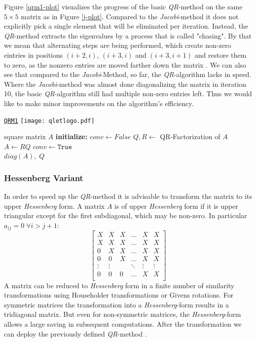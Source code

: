 \documentclass[12pt]{article}
\begin{document}
Figure \ref{qrm1-plot} visualizes the progress of the basic \textit{QR}-method on the same $5 \times 5$ matrix as in Figure \ref{j-plot}. Compared to the \textit{Jacobi}-method it does not explicitly pick a single element that will be eliminated per iteration. Instead, the \textit{QR}-method extracts the eigenvalues by a process that is called "chasing". By that we mean that alternating steps are being performed, which create non-zero eintries in positions $(i+2, i)$, $(i+3, i)$ and $(i+3, i+1)$ and restore them to zero, as the nonzero entries are moved farther down the matrix \citep[p. 130]{NLA}. We can also see that compared to the \textit{Jacobi}-Method, so far, the \textit{QR}-algorithm lacks in speed. Where the \textit{Jacobi}-method was almost done diagonalizing the matrix in iteration 10, the basic \textit{QR}-algorithm still had multiple non-zero entries left. Thus we would like to make minor improvements on the algorithm's efficiency.
\begin{algorithm}
\caption{\href {https://github.com/thsis/NIS18/blob/master/algorithms/eigen.py}{\texttt{QRM1}}  \protect\texttt{[image: qletlogo.pdf]}}
\label{qr1-meth}
  \begin{algorithmic}[1]
    \Require square matrix $A$
    \Statex \textbf{initialize: } $conv \gets False$
      \State $Q, R \gets$ QR-Factorization of $A$
      \State $A \gets RQ$
        \State $conv \gets \texttt{True}$
      \EndIf
    \EndWhile\\
    \Return $diag\left(A\right),\; Q$
  \end{algorithmic}
\end{algorithm}


\subsubsection{Hessenberg Variant}

In order to speed up the \textit{QR}-method it is advisable to transform the matrix to its upper \textit{Hessenberg} form. A matrix $A$ is of upper \textit{Hessenberg} form if it is upper triangular except for the first subdiagonal, which may be non-zero. In particular $a_{ij} = 0\; \forall i > j + 1$:
\small
$$
\begin{bmatrix}
X & X & X  & \dots &  X & X\\
X & X & X &  \dots &  X & X\\
0 & X & X &  \dots &  X & X\\
0 & 0 & X &  \dots &  X & X \\
\vdots &  \vdots & & \ddots  & \vdots  & \vdots\\
0 & 0 & 0 &  \dots &  X & X \\
\end{bmatrix}$$
\normalsize
A matrix can be reduced to \textit{Hessenberg} form in a finite number of similarity transformations using Householder transformations or Givens rotations. For symmetric matrices the transformation into a \textit{Hessenberg}-form results in a tridiagonal matrix. But even for non-symmetric matrices, the \textit{Hessenberg}-form allows a large saving in subsequent computations. After the transformation we can deploy the previously defined \textit{QR}-method \citep[p. 130]{NLA}.
\end{document}
